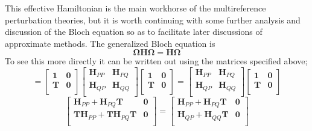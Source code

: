 \noindent This effective Hamiltonian is the main workhorse of the multireference perturbation theories, but it is worth
continuing with some further analysis and discussion of the Bloch equation so as to facilitate later
discussions of approximate methods. The generalized Bloch equation is  
\begin{equation}
\boldsymbol{\Omega}\mathbf{H}\boldsymbol{\Omega} =
\mathbf{H}\boldsymbol{\Omega}
\label{eqn:GeneralizedBloch}
\end{equation}
To see this more directly it can be written out using the matrices specified above;
\begin{equation*}
=
\begin{bmatrix}
\mathbf{1} & \mathbf{0} \\ 
\mathbf{T} & \mathbf{0} \\ 
\end{bmatrix}
\begin{bmatrix}
 \mathbf{H}_{PP} & \mathbf{H}_{PQ} \\ 
 \mathbf{H}_{QP} & \mathbf{H}_{QQ} \\ 
\end{bmatrix}
\begin{bmatrix}
\mathbf{1} & \mathbf{0} \\ 
\mathbf{T} & \mathbf{0} \\ 
\end{bmatrix}
=
\begin{bmatrix}
 \mathbf{H}_{PP} & \mathbf{H}_{PQ} \\ 
 \mathbf{H}_{QP} & \mathbf{H}_{QQ} \\ 
\end{bmatrix}
\begin{bmatrix}
\mathbf{1} & \mathbf{0} \\ 
\mathbf{T} & \mathbf{0} \\ 
\end{bmatrix}
\end{equation*}
\begin{equation*}
\begin{bmatrix}
 \mathbf{H}_{PP} + \mathbf{H}_{PQ}\mathbf{T}& \mathbf{0} \\ 
 \mathbf{T}\mathbf{H}_{PP} + \mathbf{T}\mathbf{H}_{PQ}\mathbf{T}& \mathbf{0} \\ 
\end{bmatrix}
=
\begin{bmatrix}
 \mathbf{H}_{PP} + \mathbf{H}_{PQ}\mathbf{T} & \mathbf{0} \\ 
 \mathbf{H}_{QP} + \mathbf{H}_{QQ}\mathbf{T} & \mathbf{0} \\ 
\end{bmatrix}
\label{eqn:BlochGenMat}
\end{equation*}
